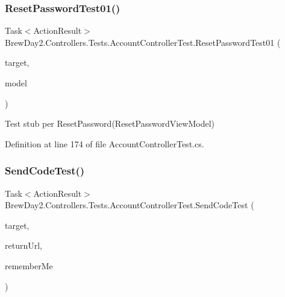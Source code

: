 \subsubsection{\texorpdfstring{Reset\+Password\+Test01()}{ResetPasswordTest01()}}
{\footnotesize\ttfamily Task$<$Action\+Result$>$ Brew\+Day2.\+Controllers.\+Tests.\+Account\+Controller\+Test.\+Reset\+Password\+Test01 (\begin{DoxyParamCaption}\item[{\mbox{[}\+Pex\+Assume\+Under\+Test\mbox{]} \mbox{\hyperlink{class_brew_day2_1_1_controllers_1_1_account_controller}{Account\+Controller}}}]{target,  }\item[{\mbox{\hyperlink{class_brew_day2_1_1_models_1_1_reset_password_view_model}{Reset\+Password\+View\+Model}}}]{model }\end{DoxyParamCaption})}



Test stub per Reset\+Password(\+Reset\+Password\+View\+Model)



Definition at line 174 of file Account\+Controller\+Test.\+cs.

\mbox{\label{class_brew_day2_1_1_controllers_1_1_tests_1_1_account_controller_test_acad5b363b80ec10bd0cef4df916a8a05}} 
\subsubsection{\texorpdfstring{Send\+Code\+Test()}{SendCodeTest()}}
{\footnotesize\ttfamily Task$<$Action\+Result$>$ Brew\+Day2.\+Controllers.\+Tests.\+Account\+Controller\+Test.\+Send\+Code\+Test (\begin{DoxyParamCaption}\item[{\mbox{[}\+Pex\+Assume\+Under\+Test\mbox{]} \mbox{\hyperlink{class_brew_day2_1_1_controllers_1_1_account_controller}{Account\+Controller}}}]{target,  }\item[{string}]{return\+Url,  }\item[{bool}]{remember\+Me }\end{DoxyParamCaption})}



